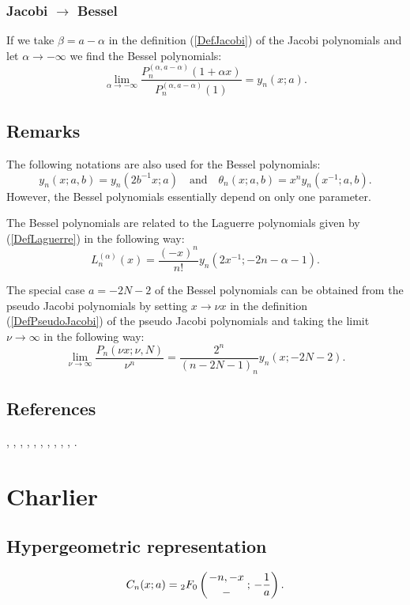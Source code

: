 \documentclass[envcountchap,graybox]{svmono}
\newcounter{rom}
\newcommand{\hyp}[5]{\mbox{}_{#1}{F}_{#2}
\left(\genfrac{}{}{0pt}{}{#3}{#4}\,;\,#5\right)}
\begin{document}
\subsubsection*{Jacobi $\rightarrow$ Bessel}
If we take $\beta=a-\alpha$ in the definition (\ref{DefJacobi}) of the Jacobi polynomials
and let $\alpha\rightarrow -\infty$ we find the Bessel polynomials:
$$\lim_{\alpha\rightarrow -\infty}
\frac{P_n^{(\alpha,a-\alpha)}(1+\alpha x)}{P_n^{(\alpha,a-\alpha)}(1)}=y_n(x;a).$$

\subsection*{Remarks}
The following notations are also used for the Bessel polynomials:
$$y_n(x;a,b)=y_n(2b^{-1}x;a)\quad\textrm{and}\quad\theta_n(x;a,b)=x^ny_n(x^{-1};a,b).$$
However, the Bessel polynomials essentially depend on only one parameter.

\noindent
The Bessel polynomials are related to the Laguerre polynomials given by (\ref{DefLaguerre})
in the following way:
$$L_n^{(\alpha)}(x)=\frac{(-x)^n}{n!}y_n(2x^{-1};-2n-\alpha-1).$$

\noindent
The special case $a=-2N-2$ of the Bessel polynomials can be obtained from the pseudo Jacobi
polynomials by setting $x\rightarrow\nu x$ in the definition (\ref{DefPseudoJacobi}) of the
pseudo Jacobi polynomials and taking the limit $\nu\rightarrow\infty$ in the following way:
$$\lim\limits_{\nu\rightarrow\infty}\frac{P_n(\nu x;\nu,N)}{\nu^n}
=\frac{2^n}{(n-2N-1)_n}y_n(x;-2N-2).$$

\subsection*{References}
\cite{Andrade}, \cite{BergVignat}, \cite{Carlitz57I}, \cite{Dattoli2003},
\cite{DohaAhmed2004}, \cite{DohaAhmed2006}, \cite{Grosswald}, \cite{Ismail2005II},
\cite{KrallFrink}, \cite{Lesky98}, \cite{NikiforovUvarov}.


\section{Charlier}

\par\setcounter{equation}{0}

\subsection*{Hypergeometric representation}
\begin{equation}
\label{DefCharlier}
C_n(x;a)=\hyp{2}{0}{-n,-x}{-}{-\frac{1}{a}}.
\end{equation}
\end{document}
